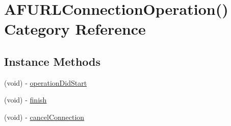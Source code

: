 \hypertarget{category_a_f_u_r_l_connection_operation_07_08}{\section{A\-F\-U\-R\-L\-Connection\-Operation() Category Reference}
\label{category_a_f_u_r_l_connection_operation_07_08}
}
\subsection*{Instance Methods}
\begin{DoxyCompactItemize}
\item 
(void) -\/ \hyperlink{category_a_f_u_r_l_connection_operation_07_08_adb3f442720957460984d98ba4656f237}{operation\-Did\-Start}
\item 
(void) -\/ \hyperlink{category_a_f_u_r_l_connection_operation_07_08_afa07116e9179944df7fcb762c8c4ddd3}{finish}
\item 
(void) -\/ \hyperlink{category_a_f_u_r_l_connection_operation_07_08_a049154202d6a6d7fddab2c887b411b66}{cancel\-Connection}
\end{DoxyCompactItemize}
